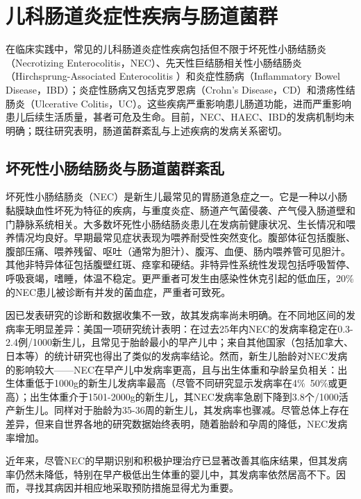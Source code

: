 \section{儿科肠道炎症性疾病与肠道菌群}
\label{sec:enterocolitis}
在临床实践中，常见的儿科肠道炎症性疾病包括但不限于坏死性小肠结肠炎（Necrotizing Enterocolitis，NEC）、先天性巨结肠相关性小肠结肠炎（Hirchsprung-Associated Enterocolitis ）和炎症性肠病（Inflammatory Bowel Disease，IBD）；炎症性肠病又包括克罗恩病（Crohn’s Disease，CD）和溃疡性结肠炎（Ulcerative Colitis，UC）。这些疾病严重影响患儿肠道功能，进而严重影响患儿后续生活质量，甚者可危及生命。目前，NEC、HAEC、IBD的发病机制均未明确；既往研究表明，肠道菌群紊乱与上述疾病的发病关系密切。

\subsection{坏死性小肠结肠炎与肠道菌群紊乱}
坏死性小肠结肠炎（NEC）是新生儿最常见的胃肠道急症之一。它是一种以小肠黏膜缺血性坏死为特征的疾病，与重度炎症、肠道产气菌侵袭、产气侵入肠道壁和门静脉系统相关\cite{neu2011necrotizing}。大多数坏死性小肠结肠炎患儿在发病前健康状况、生长情况和喂养情况均良好\cite{hallstrom2006laboratory}。早期最常见症状表现为喂养耐受性突然变化。腹部体征包括腹胀、腹部压痛、喂养残留、呕吐（通常为胆汁）、腹泻、血便、肠内喂养管可见胆汁\cite{walsh1988necrotizing, yu1980improving}。其他非特异体征包括腹壁红斑、痉挛和硬结。非特异性系统性发现包括呼吸暂停、呼吸衰竭，嗜睡，体温不稳定。更严重者可发生由感染性休克引起的低血压，20\%的NEC患儿被诊断有并发的菌血症\cite{kliegman1984necrotizing}，严重者可致死。

因已发表研究的诊断和数据收集不一致，故其发病率尚未明确\cite{zani2015scavenger}。在不同地区间的发病率无明显差异：美国一项研究统计表明：在过去25年内NEC的发病率稳定在0.3-2.4例/1000新生儿，且常见于胎龄最小的早产儿中\cite{pickard2009short}；来自其他国家（包括加拿大、日本等）的统计研究也得出了类似的发病率结论\cite{kawase2006gastrointestinal}。然而，新生儿胎龄对NEC发病的影响较大——NEC在早产儿中发病率更高，且与出生体重和孕龄呈负相关：出生体重低于1000g的新生儿发病率最高（尽管不同研究显示发病率在4\%~50\%或更高）；出生体重介于1501-2000g的新生儿，其NEC发病率急剧下降到3.8个/1000活产新生儿\cite{stoll2015trends}。同样对于胎龄为35-36周的新生儿，其发病率也骤减。尽管总体上存在差异，但来自世界各地的研究数据始终表明，随着胎龄和孕周的降低，NEC发病率增加\cite{backhed2005host,rees2010national,yee2012incidence}。

近年来，尽管NEC的早期识别和积极护理治疗已显著改善其临床结果，但其发病率仍然未降低，特别在早产极低出生体重的婴儿中，其发病率依然居高不下。因而，寻找其病因并相应地采取预防措施显得尤为重要。

